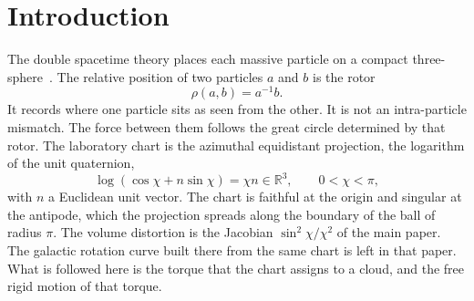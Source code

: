 \documentclass[a4paper]{article}
\begin{document}
\begin{abstract}
\[
\omega_1=A\operatorname{sech}(kt),\qquad
\omega_2=B\tanh(kt),\qquad
\omega_3=C\operatorname{sech}(kt),
\]
with \(k\), \(A\), and \(C\) fixed by the moments and by \(B\), satisfies those equations, keeps the energy \(\tfrac12 I_2 B^2\), and keeps \(L^2=2EI_2\). The intermediate component changes sign once. A residual of relative size \(\varepsilon<1/6\), growing at this rate, takes longer to reach half amplitude than the reversal takes to pass between the two half-amplitude states, and that wait exceeds every bound as the residual shrinks, while the crossing scale \(1/k\) stays fixed. The aggregate enters the free motion only through its inertia tensor. Over the \(2^n\) assignments of a sign to each of \(n\) moments, the uniform average of the signed sum is zero, and the uniform average of its square is the sum of the squares. The canonical weight at inverse temperature \(\beta>0\) is the product of three centered Gaussians of variances \(1/(\beta I_i)\), the normalized factor \(e^{-\beta E}\). The mean of the gap \(L^2-2EI_2\) is \((I_1+I_3-2I_2)/\beta\). That weight is positive on both signs of the gap, and on the transverse residuals of relative size in \((0,1/6)\). Each of those residuals waits longer than the reversal takes to cross.
\end{abstract}

\section{Introduction}

The double spacetime theory places each massive particle on a compact three-sphere~\cite{dst-main}. The relative position of two particles \(a\) and \(b\) is the rotor
\[
\rho(a,b)=a^{-1}b.
\]
It records where one particle sits as seen from the other. It is not an intra-particle mismatch. The force between them follows the great circle determined by that rotor. The laboratory chart is the azimuthal equidistant projection, the logarithm of the unit quaternion,
\begin{equation}
\label{eq:log}
\log(\cos\chi+n\sin\chi)=\chi n\in\mathbb{R}^3,
\qquad 0<\chi<\pi,
\end{equation}
with \(n\) a Euclidean unit vector. The chart is faithful at the origin and singular at the antipode, which the projection spreads along the boundary of the ball of radius \(\pi\). The volume distortion is the Jacobian \(\sin^2\chi/\chi^2\) of the main paper. The galactic rotation curve built there from the same chart is left in that paper. What is followed here is the torque that the chart assigns to a cloud, and the free rigid motion of that torque.
\end{document}
